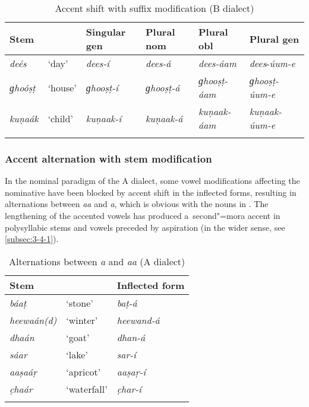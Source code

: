 \begin{table}[ht]
\caption{Accent shift with suffix modification (B dialect)}
\begin{tabularx}{\textwidth}{ Q l l l l l }
\lsptoprule
Stem &
&
Singular gen &
Plural nom &
Plural obl &
Plural gen \\\hline
\textit{deés} &
`day' &
\textit{dees-í} &
\textit{dees-á} &
\textit{dees-áam} &
\textit{dees}-\textit{úum-e}\\
\textit{ɡhoóṣṭ} &
`house' &
\textit{ɡhooṣṭ-í} &
\textit{ɡhooṣṭ-á} &
\textit{ɡhooṣṭ-áam} &
\textit{ɡhooṣṭ-úum-e} \\
\textit{kuṇaák} &
`child' &
\textit{kuṇaak-í} &
\textit{kuṇaak-á} &
\textit{kuṇaak-áam} &
\textit{kuṇaak-úum-e} \\\lspbottomrule
\end{tabularx}
\label{tab:3-12}
\end{table}

\subsubsection*{Accent alternation with stem modification}

In the nominal paradigm of the A dialect, some vowel modifications affecting the nominative have been blocked by accent shift in the inflected forms, resulting in alternations between \textit{aa} and \textit{a}, which is obvious with the nouns in . The lengthening of the accented vowels has produced a~second"=mora accent in polysyllabic stems and vowels preceded by aspiration (in the wider sense, see \ref{subsec:3-4-1}). 

\begin{table}[ht]
\caption{Alternations between \textit{a} and \textit{aa} (A dialect)}
\begin{tabularx}{.75\textwidth}{ Q Q Q }
\lsptoprule
Stem &
&
Inflected form\\\hline
\textit{báaṭ} &
`stone' &
\textit{baṭ-á} \\
\textit{heewaán(d)} &
`winter' &
\textit{heewand-á} \\
\textit{dhaán} &
`goat' &
\textit{dhan-á}\\
\textit{sáar} &
`lake' &
\textit{sar-í}\\
\textit{aaṣaáṛ} &
`apricot' &
\textit{aaṣaṛ-í} \\
\textit{c̣haár} &
`waterfall' &
\textit{c̣har-í} \\\lspbottomrule
\end{tabularx}
\label{tab:3-13}
\end{table}


